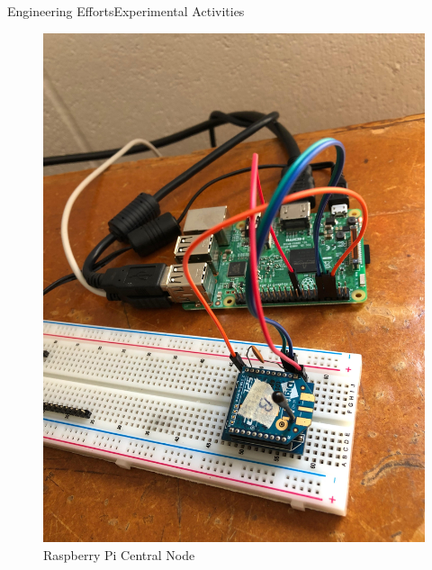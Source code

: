 \documentclass{beamer}
\begin{document}
\begin{frame}{Engineering Efforts}{Experimental Activities}
  \begin{figure}
    \centering
    \includegraphics[scale=.04]{figs/img/PiXBee.jpg}
    \caption{Raspberry Pi Central Node}
    \label{fig:RpiCentralNode}
\end{figure}
\end{frame}
\end{document}
